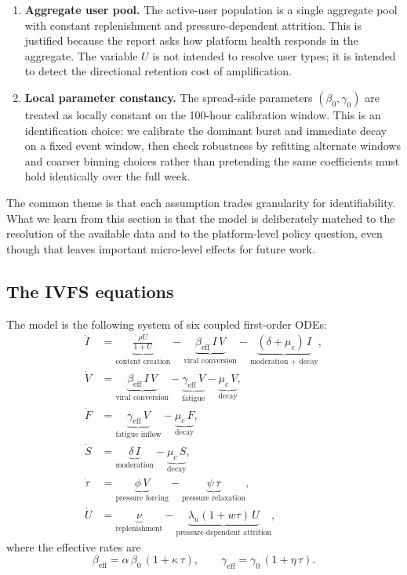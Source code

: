 \documentclass[11pt]{article}
\begin{document}
\begin{enumerate}[leftmargin=1.5em]
    \item \textbf{Aggregate user pool.} The active-user population is a single aggregate pool with constant replenishment and pressure-dependent attrition. This is justified because the report asks how platform health responds in the aggregate. The variable $U$ is not intended to resolve user types; it is intended to detect the directional retention cost of amplification.

    \item \textbf{Local parameter constancy.} The spread-side parameters $(\beta_0, \gamma_0)$ are treated as locally constant on the 100-hour calibration window. This is an identification choice: we calibrate the dominant burst and immediate decay on a fixed event window, then check robustness by refitting alternate windows and coarser binning choices rather than pretending the same coefficients must hold identically over the full week.
\end{enumerate}

The common theme is that each assumption trades granularity for identifiability. What we learn from this section is that the model is deliberately matched to the resolution of the available data and to the platform-level policy question, even though that leaves important micro-level effects for future work.

\subsection{The IVFS equations}
\label{sec:equations}

The model is the following system of six coupled first-order ODEs:
\begin{align}
\dot{I} &= \underbrace{\frac{\rho U}{1+U}}_{\text{content creation}} - \underbrace{\beta_{\mathrm{eff}}\, I\, V}_{\text{viral conversion}} - \underbrace{(\delta + \mu_c)\, I}_{\text{moderation + decay}}, \label{eq:I} \\[6pt]
\dot{V} &= \underbrace{\beta_{\mathrm{eff}}\, I\, V}_{\text{viral conversion}} - \underbrace{\gamma_{\mathrm{eff}}\, V}_{\text{fatigue}} - \underbrace{\mu_c\, V}_{\text{decay}}, \label{eq:V} \\[6pt]
\dot{F} &= \underbrace{\gamma_{\mathrm{eff}}\, V}_{\text{fatigue inflow}} - \underbrace{\mu_c\, F}_{\text{decay}}, \label{eq:F} \\[6pt]
\dot{S} &= \underbrace{\delta\, I}_{\text{moderation}} - \underbrace{\mu_c\, S}_{\text{decay}}, \label{eq:S} \\[6pt]
\dot{\tau} &= \underbrace{\phi\, V}_{\text{pressure forcing}} - \underbrace{\psi\, \tau}_{\text{pressure relaxation}}, \label{eq:tau} \\[6pt]
\dot{U} &= \underbrace{\nu}_{\text{replenishment}} - \underbrace{\lambda_u (1 + w\tau)\, U}_{\text{pressure-dependent attrition}}, \label{eq:U}
\end{align}
where the effective rates are
\begin{equation}
\beta_{\mathrm{eff}} = \alpha\, \beta_0\, (1 + \kappa\, \tau), \qquad
\gamma_{\mathrm{eff}} = \gamma_0\, (1 + \eta\, \tau).
\label{eq:eff_rates}
\end{equation}
\end{document}
